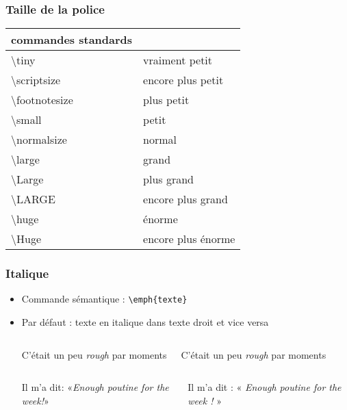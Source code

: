\begin{frame}

	\frametitle{Taille de la police}
		
		\begin{tabularx}{\textwidth}{lY}
			\hline\hline
			\textbf{commandes standards}	&									\\
			\hline
			\textbackslash tiny				&	{\tiny vraiment petit} 			\\
			\textbackslash scriptsize		&	{\scriptsize encore plus petit}	\\
			\textbackslash footnotesize		&	{\footnotesize plus petit}		\\
			\textbackslash small			&	{\small petit}					\\
			\textbackslash normalsize		&	{\normalsize normal}			\\
			\textbackslash large			&	{\large grand}					\\
			\textbackslash Large			&	{\Large plus grand}				\\
			\textbackslash LARGE			&	{\LARGE encore plus grand}		\\
			\textbackslash huge				&	{\huge énorme} 					\\
			\textbackslash Huge				&	{\Huge encore plus énorme}		\\
			\hline\hline
		\end{tabularx}
\end{frame}


\begin{frame}[fragile]

	\frametitle{Italique}
	
	\begin{itemize}
		\item Commande sémantique : \lstinline|\emph{texte}|
		
		\pause
		
		\item Par défaut : texte en italique dans texte droit et vice versa
		\begin{columns}
			\vspace{-1.4em}
	\begin{codesource}
	C'était un peu \emph{rough}
	par moments	
	\end{codesource}
				C'était un peu \emph{rough} par moments
		\end{columns}
		
		\begin{columns}
			\column{.4\textwidth}
			\vspace{-1.4em}
	\begin{codesource}
	Il m'a dit: «\emph{Enough
	\emph{poutine} for the week!}»	
	\end{codesource} 
			\column{.4\textwidth}
				Il m’a dit : « \emph{Enough {\em poutine} for the week !} »
		\end{columns}	
		
	\end{itemize}
\end{frame}

